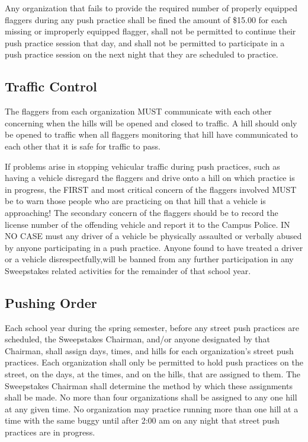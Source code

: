 \documentclass[openany]{book}
\begin{document}
Any organization that fails to provide the required number of properly equipped flaggers during any push practice shall be fined the amount of \$15.00 for each missing or improperly equipped flagger, shall not be permitted to continue their push practice session that day, and shall not be permitted to participate in a push practice session on the next night that they are scheduled to practice.

\subsection{Traffic Control}

The flaggers from each organization MUST communicate with each other concerning when the hills will be opened and closed to traffic. A hill should only be opened to traffic when all flaggers monitoring that hill have communicated to each other that it is safe for traffic to pass.

If problems arise in stopping vehicular traffic during push practices, such as having a vehicle disregard the flaggers and drive onto a hill on which practice is in progress, the FIRST and most critical concern of the flaggers involved MUST be to warn those people who are practicing on that hill that a vehicle is approaching! The secondary concern of the flaggers should be to record the license number of the offending vehicle and report it to the Campus Police. IN NO CASE must any driver of a vehicle be physically assaulted or verbally abused by anyone participating in a push practice. Anyone found to have treated a driver or a vehicle disrespectfully,will be banned from any further participation in any Sweepstakes related activities for the remainder of that school year.

\subsection{Pushing Order}

Each school year during the spring semester, before any street push practices are scheduled, the Sweepstakes Chairman, and/or anyone designated by that Chairman, shall assign days, times, and hills for each organization's street push practices. Each organization shall only be permitted to hold push practices on the street, on the days, at the times, and on the hills, that are assigned to them. The Sweepstakes Chairman shall determine the method by which these assignments shall be made. No more than four organizations shall be assigned to any one hill at any given time. No organization may practice running more than one hill at a time with the same buggy until after 2:00 am on any night that street push practices are in progress.
\end{document}
